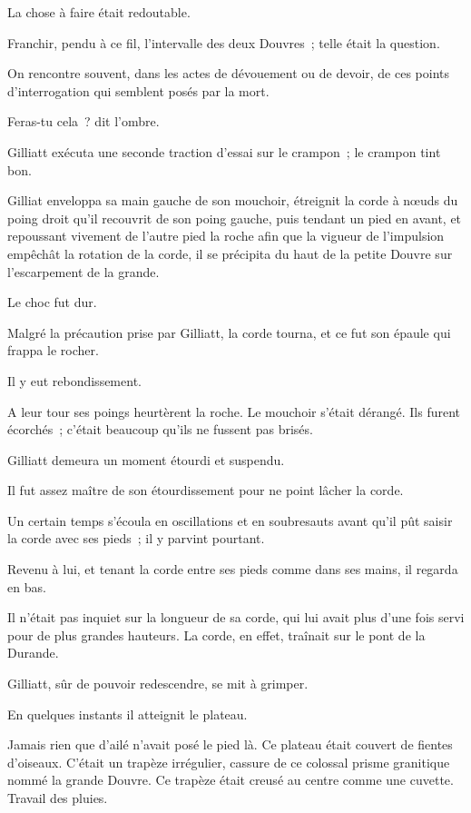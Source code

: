\documentclass[french,twoside]{book} %
\begin{document}
La chose à faire était redoutable.\par
Franchir, pendu à ce fil, l’intervalle des deux Douvres ; telle était la question.\par
 On rencontre souvent, dans les actes de dévouement ou de devoir, de ces points d’interrogation qui semblent posés par la mort.\par
Feras-tu cela ? dit l’ombre.\par
Gilliatt exécuta une seconde traction d’essai sur le crampon ; le crampon tint bon.\par
Gilliat enveloppa sa main gauche de son mouchoir, étreignit la corde à nœuds du poing droit qu’il recouvrit de son poing gauche, puis tendant un pied en avant, et repoussant vivement de l’autre pied la roche afin que la vigueur de l’impulsion empêchât la rotation de la corde, il se précipita du haut de la petite Douvre sur l’escarpement de la grande.\par
Le choc fut dur.\par
Malgré la précaution prise par Gilliatt, la corde tourna, et ce fut son épaule qui frappa le rocher.\par
Il y eut rebondissement.\par
A leur tour ses poings heurtèrent la roche. Le mouchoir s’était dérangé. Ils furent écorchés ; c’était beaucoup qu’ils ne fussent pas brisés.\par
Gilliatt demeura un moment étourdi et suspendu.\par
Il fut assez maître de son étourdissement pour ne point lâcher la corde.\par
Un certain temps s’écoula en oscillations et en soubresauts avant qu’il pût saisir la corde avec ses pieds ; il y parvint pourtant.\par
Revenu à lui, et tenant la corde entre ses pieds comme dans ses mains, il regarda en bas.\par
Il n’était pas inquiet sur la longueur de sa corde, qui lui avait plus d’une fois servi pour de plus grandes  hauteurs. La corde, en effet, traînait sur le pont de la Durande.\par
Gilliatt, sûr de pouvoir redescendre, se mit à grimper.\par
En quelques instants il atteignit le plateau.\par
Jamais rien que d’ailé n’avait posé le pied là. Ce plateau était couvert de fientes d’oiseaux. C’était un trapèze irrégulier, cassure de ce colossal prisme granitique nommé la grande Douvre. Ce trapèze était creusé au centre comme une cuvette. Travail des pluies.\par
\end{document}
